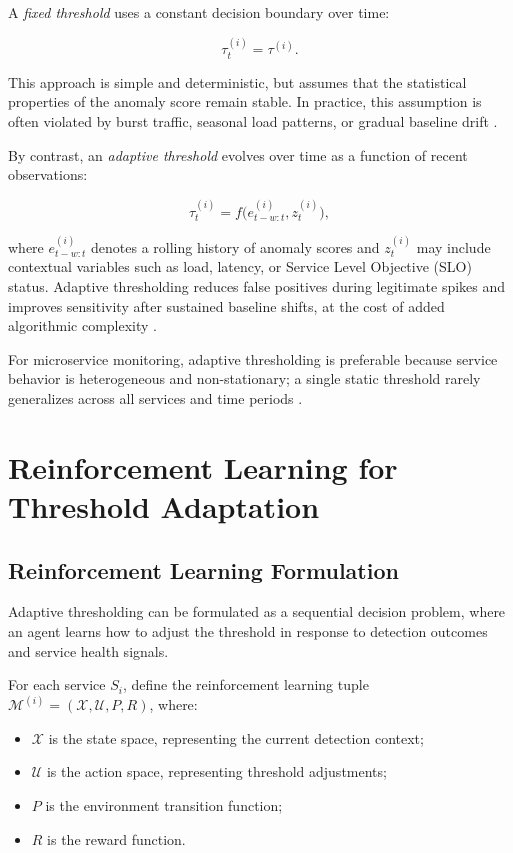 A \emph{fixed threshold} uses a constant decision boundary over time:

\[
\tau_t^{(i)} = \tau^{(i)}.
\]

This approach is simple and deterministic, but assumes that the statistical 
properties of the anomaly score remain stable. In practice, this assumption is 
often violated by burst traffic, seasonal load patterns, or gradual baseline 
drift \cite{turn0search8}.

By contrast, an \emph{adaptive threshold} evolves over time as a function of 
recent observations:

\[
\tau_t^{(i)} = f\big(e_{t-w:t}^{(i)}, z_t^{(i)}\big),
\]

where $e_{t-w:t}^{(i)}$ denotes a rolling history of anomaly scores and 
$z_t^{(i)}$ may include contextual variables such as load, latency, or Service 
Level Objective (SLO) status. Adaptive thresholding reduces false positives 
during legitimate spikes and improves sensitivity after sustained baseline 
shifts, at the cost of added algorithmic complexity \cite{turn0search8}.

For microservice monitoring, adaptive thresholding is preferable because service 
behavior is heterogeneous and non-stationary; a single static threshold rarely 
generalizes across all services and time periods \cite{turn0search8}.

\section{Reinforcement Learning for Threshold Adaptation}
\label{sec:threshold_rl}

\subsection{Reinforcement Learning Formulation}
\label{subsec:threshold_rl_formulation}

Adaptive thresholding can be formulated as a sequential decision problem, where 
an agent learns how to adjust the threshold in response to detection outcomes 
and service health signals.

For each service $S_i$, define the reinforcement learning tuple 
$\mathcal{M}^{(i)} = (\mathcal{X}, \mathcal{U}, P, R)$, where:

\begin{itemize}
    \item $\mathcal{X}$ is the state space, representing the current detection context;
    
    \item $\mathcal{U}$ is the action space, representing threshold adjustments;
    
    \item $P$ is the environment transition function;
    
    \item $R$ is the reward function.
\end{itemize}


